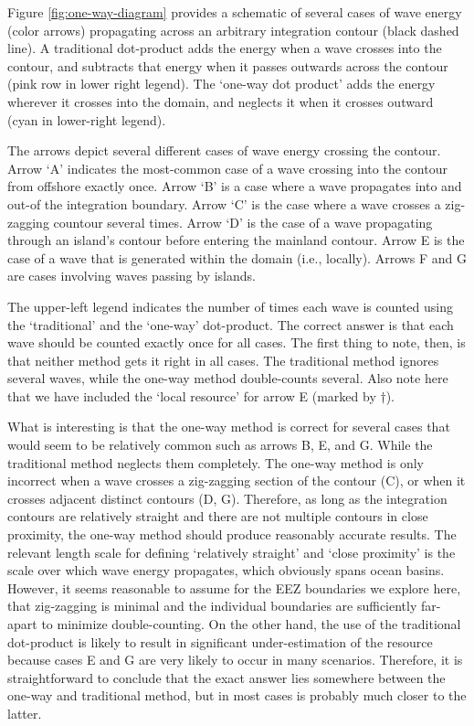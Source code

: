 Figure \ref{fig:one-way-diagram} provides a schematic of several cases of wave energy (color arrows) propagating across an arbitrary integration contour (black dashed line). A traditional dot-product adds the energy when a wave crosses into the contour, and subtracts that energy when it passes outwards across the contour (pink row in lower right legend). The `one-way dot product' adds the energy wherever it crosses into the domain, and neglects it when it crosses outward (cyan in lower-right legend).

The arrows depict several different cases of wave energy crossing the contour. Arrow `A' indicates the most-common case of a wave crossing into the contour from offshore exactly once. Arrow `B' is a case where a wave propagates into and out-of the integration boundary. Arrow `C' is the case where a wave crosses a zig-zagging countour several times. Arrow `D' is the case of a wave propagating through an island's contour before entering the mainland contour. Arrow E is the case of a wave that is generated within the domain (i.e., locally). Arrows F and G are cases involving waves passing by islands.

The upper-left legend indicates the number of times each wave is counted using the `traditional' and the `one-way' dot-product. The correct answer is that each wave should be counted exactly once for all cases. The first thing to note, then, is that neither method gets it right in all cases. The traditional method ignores several waves, while the one-way method double-counts several. Also note here that we have included the `local resource' for arrow E (marked by $\dagger$).

What is interesting is that the one-way method is correct for several cases that would seem to be relatively common such as arrows B, E, and G. While the traditional method neglects them completely. The one-way method is only incorrect when a wave crosses a zig-zagging section of the contour (C), or when it crosses adjacent distinct contours (D, G). Therefore, as long as the integration contours are relatively straight and there are not multiple contours in close proximity, the one-way method should produce reasonably accurate results. 
The relevant length scale for defining `relatively straight' and `close proximity' is the scale over which wave energy propagates, which obviously spans ocean basins. However, it seems reasonable to assume for the EEZ boundaries we explore here, that zig-zagging is minimal and the individual boundaries are sufficiently far-apart to minimize double-counting. On the other hand, the use of the traditional dot-product is likely to result in significant under-estimation of the resource because cases E and G are very likely to occur in many scenarios. Therefore, it is straightforward to conclude that the exact answer lies somewhere between the one-way and traditional method, but in most cases is probably much closer to the latter.

